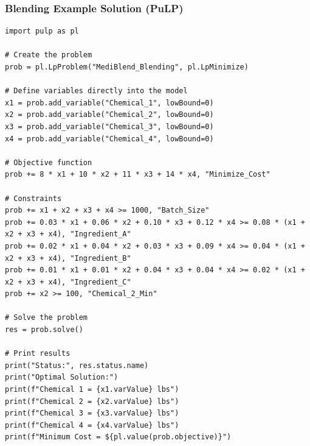 \documentclass{beamer}
\begin{document}
\begin{frame}
\frametitle{Blending Example Solution (PuLP)}
\begin{lstlisting}
import pulp as pl

# Create the problem
prob = pl.LpProblem("MediBlend_Blending", pl.LpMinimize)

# Define variables directly into the model
x1 = prob.add_variable("Chemical_1", lowBound=0)
x2 = prob.add_variable("Chemical_2", lowBound=0)
x3 = prob.add_variable("Chemical_3", lowBound=0)
x4 = prob.add_variable("Chemical_4", lowBound=0)

# Objective function
prob += 8 * x1 + 10 * x2 + 11 * x3 + 14 * x4, "Minimize_Cost"

# Constraints
prob += x1 + x2 + x3 + x4 >= 1000, "Batch_Size"
prob += 0.03 * x1 + 0.06 * x2 + 0.10 * x3 + 0.12 * x4 >= 0.08 * (x1 + x2 + x3 + x4), "Ingredient_A"
prob += 0.02 * x1 + 0.04 * x2 + 0.03 * x3 + 0.09 * x4 >= 0.04 * (x1 + x2 + x3 + x4), "Ingredient_B"
prob += 0.01 * x1 + 0.01 * x2 + 0.04 * x3 + 0.04 * x4 >= 0.02 * (x1 + x2 + x3 + x4), "Ingredient_C"
prob += x2 >= 100, "Chemical_2_Min"

# Solve the problem
res = prob.solve()

# Print results
print("Status:", res.status.name)
print("Optimal Solution:")
print(f"Chemical 1 = {x1.varValue} lbs")
print(f"Chemical 2 = {x2.varValue} lbs")
print(f"Chemical 3 = {x3.varValue} lbs")
print(f"Chemical 4 = {x4.varValue} lbs")
print(f"Minimum Cost = ${pl.value(prob.objective)}")
\end{lstlisting}
\end{frame}
\end{document}
